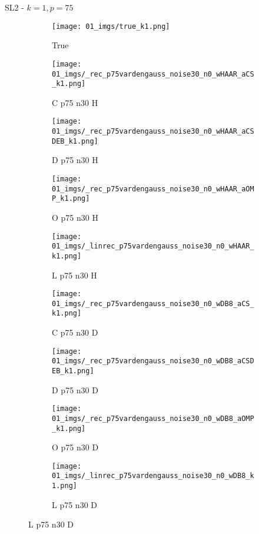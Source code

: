 \begin{frame}{SL2 - $k=1,p=75$}{}
\begin{figure}
\begin{subfigure}{0.1\textwidth}
\texttt{[image: 01\_imgs/true\_k1.png]}
\caption*{\Tiny True}
\end{subfigure}
\begin{subfigure}{0.1\textwidth}
\texttt{[image: 01\_imgs/\_rec\_p75vardengauss\_noise30\_n0\_wHAAR\_aCS\_k1.png]}
\caption*{\Tiny C p75 n30 H}
\end{subfigure}
\begin{subfigure}{0.1\textwidth}
\texttt{[image: 01\_imgs/\_rec\_p75vardengauss\_noise30\_n0\_wHAAR\_aCSDEB\_k1.png]}
\caption*{\Tiny D p75 n30 H}
\end{subfigure}
\begin{subfigure}{0.1\textwidth}
\texttt{[image: 01\_imgs/\_rec\_p75vardengauss\_noise30\_n0\_wHAAR\_aOMP\_k1.png]}
\caption*{\Tiny O p75 n30 H}
\end{subfigure}
\begin{subfigure}{0.1\textwidth}
\texttt{[image: 01\_imgs/\_linrec\_p75vardengauss\_noise30\_n0\_wHAAR\_k1.png]}
\caption*{\Tiny L p75 n30 H}
\end{subfigure}
\begin{subfigure}{0.1\textwidth}
\texttt{[image: 01\_imgs/\_rec\_p75vardengauss\_noise30\_n0\_wDB8\_aCS\_k1.png]}
\caption*{\Tiny C p75 n30 D}
\end{subfigure}
\begin{subfigure}{0.1\textwidth}
\texttt{[image: 01\_imgs/\_rec\_p75vardengauss\_noise30\_n0\_wDB8\_aCSDEB\_k1.png]}
\caption*{\Tiny D p75 n30 D}
\end{subfigure}
\begin{subfigure}{0.1\textwidth}
\texttt{[image: 01\_imgs/\_rec\_p75vardengauss\_noise30\_n0\_wDB8\_aOMP\_k1.png]}
\caption*{\Tiny O p75 n30 D}
\end{subfigure}
\begin{subfigure}{0.1\textwidth}
\texttt{[image: 01\_imgs/\_linrec\_p75vardengauss\_noise30\_n0\_wDB8\_k1.png]}
\caption*{\Tiny L p75 n30 D}
\end{subfigure}
\end{figure}
\end{frame}


